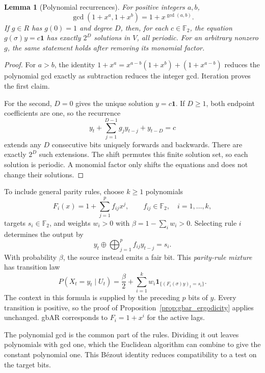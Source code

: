 \documentclass[11pt,a4paper]{article}
\providecommand{\mathds}[1]{\mathbf{#1}}
\newtheorem{lemma}[theorem]{Lemma}
\begin{document}
\begin{lemma}[Polynomial recurrences]
\label{lem:polynomial_facts}
For positive integers $a,b$,
\[
    \gcd(1+x^a,1+x^b)=1+x^{\gcd(a,b)}.
\]
If $g\in R$ has $g(0)=1$ and degree $D$, then, for each
$c\in\mathbb F_2$, the equation $g(\sigma)y=c\mathbf1$ has exactly
$2^D$ solutions in $V$, all periodic.  For an arbitrary nonzero $g$,
the same statement holds after removing its monomial factor.
\end{lemma}

\begin{proof}
For $a>b$, the identity
$1+x^a=x^{a-b}(1+x^b)+(1+x^{a-b})$
reduces the polynomial gcd exactly as subtraction reduces the integer
gcd.  Iteration proves the first claim.

For the second, $D=0$ gives the unique solution $y=c\mathbf1$.
If $D\ge1$, both endpoint coefficients are one, so the recurrence
\[
    y_t+\sum_{j=1}^{D-1}g_jy_{t-j}+y_{t-D}=c
\]
extends any $D$ consecutive bits uniquely forwards and backwards.
There are exactly $2^D$ such extensions.  The shift permutes this
finite solution set, so each solution is periodic.  A monomial factor
only shifts the equations and does not change their solutions.
\end{proof}

To include general parity rules, choose $k\ge1$ polynomials
\[
    F_i(x)=1+\sum_{j=1}^pf_{ij}x^j,
    \qquad f_{ij}\in\mathbb F_2,\quad i=1,\ldots,k,
\]
targets $s_i\in\mathbb F_2$, and weights $w_i>0$ with
$\beta=1-\sum_iw_i>0$.  Selecting rule $i$ determines the output by
\[
    y_t\oplus\bigoplus_{j=1}^p f_{ij}y_{t-j}=s_i.
\]
With probability $\beta$, the source instead emits a fair bit.
This \emph{parity-rule mixture} has transition law
\begin{equation}
\label{eq:parity_transition}
    P(X_t=y_t\mid U_t)
    =\frac{\beta}{2}+\sum_{i=1}^kw_i
        \mathds{1}_{\{(F_i(\sigma)y)_t=s_i\}}.
\end{equation}
The context in this formula is supplied by the preceding $p$ bits
of $y$.  Every transition is positive, so the proof of
Proposition~\ref{prop:gbar_ergodicity} applies unchanged.
gbAR corresponds to $F_i=1+x^i$ for the active lags.

The polynomial gcd is the common part of the rules.  Dividing it out
leaves polynomials with gcd one, which the Euclidean algorithm can
combine to give the constant polynomial one.  This B\'ezout identity
reduces compatibility to a test on the target bits.
\end{document}
